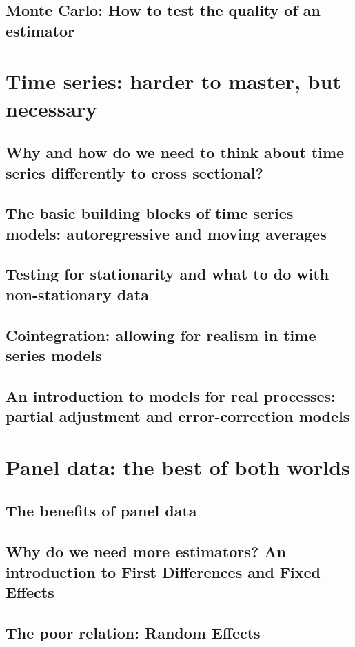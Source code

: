 \documentclass[11pt,fullpage]{book}
\begin{document}
\chapter{Monte Carlo: How to test the quality of an estimator}

\part{Time series: harder to master, but necessary}
\chapter{Why and how do we need to think about time series differently to cross sectional?}
\chapter{The basic building blocks of time series models: autoregressive and moving averages}
\chapter{Testing for stationarity and what to do with non-stationary data}
\chapter{Cointegration: allowing for realism in time series models}
\chapter{An introduction to models for real processes: partial adjustment and error-correction models}

\part{Panel data: the best of both worlds}
\chapter{The benefits of panel data}
\chapter{Why do we need more estimators? An introduction to First Differences and Fixed Effects}
\chapter{The poor relation: Random Effects}
\end{document}
